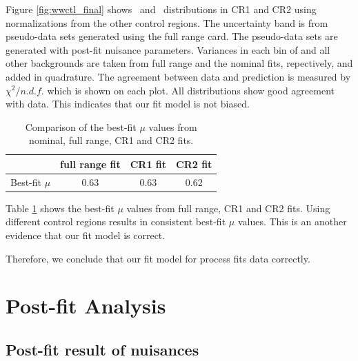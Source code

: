 Figure \ref{fig:wwctl_final} shows \mT~and \mll~distributions in CR1 and CR2 using 
normalizations from the other control regions. The uncertainty band is from pseudo-data 
sets generated using the full range card. The pseudo-data sets are generated 
with post-fit nuisance parameters. Variances in each bin of \qqww{} and all other 
backgrounds are taken from full range and the nominal fits, repectively, and added in quadrature. 
The agreement between data and prediction is measured by $\chi^2/n.d.f.$ which is 
shown on each plot. All distributions show good agreement with data.
This indicates that our \qqww{} fit model is not biased.
%
\begin{table}
\begin{center}
\begin{tabular}{c|ccc}
\hline
                    & full range fit    & CR1 fit   & CR2 fit   \\
\hline
Best-fit $\mu$      & 0.63              & 0.63      & 0.62      \\
\hline
\end{tabular}
\end{center}
\caption{Comparison of the best-fit $\mu$ values from nominal, full range, CR1 and CR2 fits.} 
\label{tab:bestfitmu_compare}
\end{table}
Table \ref{tab:bestfitmu_compare} shows the best-fit $\mu$ values from full range, 
CR1 and CR2 fits. Using different control regions results in consistent best-fit $\mu$ values. 
This is an another evidence that our fit model is correct. 

Therefore, we conclude that our fit model for \qqww{} process fits data correctly.  

\section{Post-fit Analysis}

\subsection{Post-fit result of nuisances}

